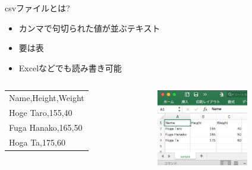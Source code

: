\documentclass[12pt, dvipdfmx]{beamer}
\begin{document}
\begin{frame}{csvファイルとは?}
    \begin{itemize}
        \item カンマで句切られた値が並ぶテキスト
        \item 要は表
        \item Excelなどでも読み書き可能
    \end{itemize}
    \begin{columns}
        \begin{column}{0.5\textwidth}
            \begin{table}[h]
                \begin{tabular}{|l|}
                    \hline
                    Name,Height,Weight\\
                    Hoge Taro,155,40\\
                    Fuga Hanako,165,50\\
                    Hoga Ta,175,60\\\hline
                \end{tabular}
            \end{table}
        \end{column}
        \begin{column}{0.5\textwidth}
            \begin{figure}[h]
                \centering
                \includegraphics[width=4cm]{img/excel_csv.png}
            \end{figure}
        \end{column}
    \end{columns}
\end{frame}
\end{document}
